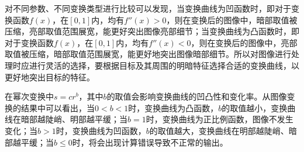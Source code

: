 对不同参数、不同变换类型进行比较可以发现，当变换曲线为凹函数时，即对于变换函数$f(x)$，在$\left[0, 1 \right] $内，均有$f''(x)>0$，则在变换后的图像中，暗部取值被压缩，亮部取值范围展宽，能更好突出图像亮部细节；当变换曲线为凸函数时，即对于变换函数$f(x)$，在$\left[0, 1 \right] $内，均有$f''(x)<0$，则在变换后的图像中，亮部取值被压缩，暗部取值范围展宽，能更好地突出图像暗部细节。所以对图像进行处理时应进行灵活的选择，要根据目标及其周围的明暗特征选择合适的变换曲线，以更好地突出目标的特征。

在幂次变换中$s=cr^b$，其中$b$的取值会影响变换曲线的凹凸性和变化率。从图像变换的结果中可以看出，当$0<b<1$时，变换曲线为凸函数，$b$的取值越小，变换曲线在暗部越陡峭、明部越平缓；当$b=1$时，变换曲线为正比例函数，图像不发生变化；当$b>1$时，变换曲线为凹函数，$b$的取值越大，变换曲线在明部越陡峭、暗部越平缓；当$b\leq 0$时，将会出现计算错误导致不正常的输出。
